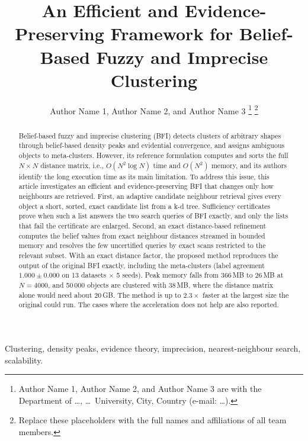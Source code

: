 \documentclass[journal]{IEEEtran}
\begin{document}
\title{An Efficient and Evidence-Preserving Framework for Belief-Based Fuzzy and Imprecise Clustering}

\author{Author Name 1, Author Name 2, and Author Name 3%
\thanks{Author Name 1, Author Name 2, and Author Name 3 are with the Department of \ldots, \ldots\ University, City, Country (e-mail: \ldots).}%
\thanks{Replace these placeholders with the full names and affiliations of all team members.}%
}

\maketitle

\begin{abstract}
Belief-based fuzzy and imprecise clustering (BFI) detects clusters of arbitrary shapes through belief-based density peaks and evidential convergence, and assigns ambiguous objects to meta-clusters. However, its reference formulation computes and sorts the full $N\times N$ distance matrix, i.e., $O(N^2\log N)$ time and $O(N^2)$ memory, and its authors identify the long execution time as its main limitation. To address this issue, this article investigates an efficient and evidence-preserving BFI that changes only how neighbours are retrieved. First, an adaptive candidate neighbour retrieval gives every object a short, sorted, exact candidate list from a k-d tree. Sufficiency certificates prove when such a list answers the two search queries of BFI exactly, and only the lists that fail the certificate are enlarged. Second, an exact distance-based refinement computes the belief values from exact neighbour distances streamed in bounded memory and resolves the few uncertified queries by exact scans restricted to the relevant subset. With an exact distance factor, the proposed method reproduces the output of the original BFI exactly, including the meta-clusters (label agreement $1.000\pm0.000$ on 13 datasets $\times$ 5 seeds). Peak memory falls from 366\,MB to 26\,MB at $N=4000$, and 50\,000 objects are clustered with 38\,MB, where the distance matrix alone would need about 20\,GB. The method is up to $2.3\times$ faster at the largest size the original could run. The cases where the acceleration does not help are also reported.
\end{abstract}

\begin{IEEEkeywords}
Clustering, density peaks, evidence theory, imprecision, nearest-neighbour search, scalability.
\end{IEEEkeywords}
\end{document}
